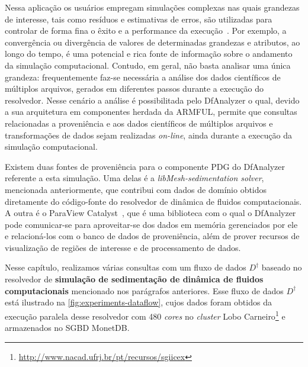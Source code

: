 Nessa aplicação os usuários empregam simulações complexas nas quais grandezas de interesse, tais como resíduos e estimativas de erros, são utilizadas para controlar de forma fina o êxito e a performance da execução~\cite{silva2016situ}. Por exemplo, a convergência ou divergência de valores de determinadas grandezas e atributos, ao longo do tempo, é uma potencial e rica fonte de informação sobre o andamento da simulação computacional. Contudo, em geral, não basta analisar uma única grandeza: frequentemente faz-se necessária a análise dos dados científicos de múltiplos arquivos, gerados em diferentes passos durante a execução do resolvedor. Nesse cenário a análise é possibilitada pelo DfAnalyzer o qual, devido a sua arquitetura em componentes herdada da ARMFUL, permite que consultas relacionadas a proveniência e aos dados científicos de múltiplos arquivos e transformações de dados sejam realizadas \textit{on-line}, ainda durante a execução da simulação computacional.

Existem duas fontes de proveniência para o componente PDG do DfAnalyzer referente a esta simulação. Uma delas é a \textit{libMesh-sedimentation solver}, mencionada anteriormente, que contribui com dados de domínio obtidos diretamente do código-fonte do resolvedor de dinâmica de fluidos computacionais. A outra é o ParaView Catalyst~\cite{ayachit2015paraview}, que é uma biblioteca com o qual o DfAnalyzer pode comunicar-se para aproveitar-se dos dados em memória gerenciados por ele e relacioná-los com o banco de dados de proveniência, além de prover recursos de visualização de regiões de interesse e de processamento de dados.

Nesse capítulo, realizamos várias consultas com um fluxo de dados \(D^{\dagger}\) baseado no resolvedor de \textbf{simulação de sedimentação de dinâmica de fluidos computacionais} mencionado nos parágrafos anteriores. Esse fluxo de dados \(D^{\dagger}\) está ilustrado na \autoref{fig:experiments-dataflow}, cujos dados foram obtidos da execução paralela desse resolvedor com 480 \textit{cores} no \textit{cluster} Lobo Carneiro\footnote{\url{http://www.nacad.ufrj.br/pt/recursos/sgiicex}} e armazenados no SGBD MonetDB.

